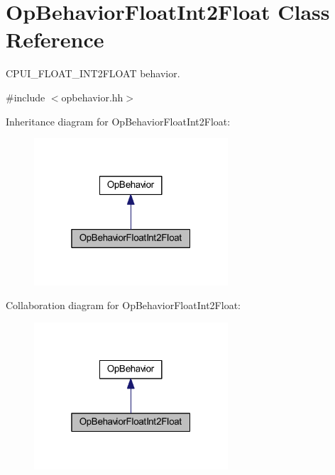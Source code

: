 \hypertarget{class_op_behavior_float_int2_float}{}\section{Op\+Behavior\+Float\+Int2\+Float Class Reference}
\label{class_op_behavior_float_int2_float}


C\+P\+U\+I\+\_\+\+F\+L\+O\+A\+T\+\_\+\+I\+N\+T2\+F\+L\+O\+AT behavior.  




{\ttfamily \#include $<$opbehavior.\+hh$>$}



Inheritance diagram for Op\+Behavior\+Float\+Int2\+Float\+:
\nopagebreak
\begin{figure}[H]
\begin{center}
\leavevmode
\includegraphics[width=205pt]{class_op_behavior_float_int2_float__inherit__graph}
\end{center}
\end{figure}


Collaboration diagram for Op\+Behavior\+Float\+Int2\+Float\+:
\nopagebreak
\begin{figure}[H]
\begin{center}
\leavevmode
\includegraphics[width=205pt]{class_op_behavior_float_int2_float__coll__graph}
\end{center}
\end{figure}
